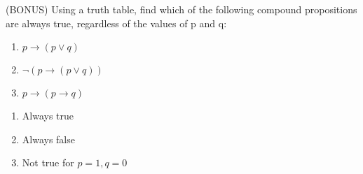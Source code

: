 \documentclass[solution, letterpaper]{cs20inclass}
\begin{document}
\problem (BONUS) Using a truth table, find which of the following compound propositions are always true, regardless of the values of p and q: 

\begin{enumerate} 
\item $p \rightarrow (p \lor q)$
\item $\lnot (p \rightarrow (p \lor q))$
\item $p \rightarrow (p \rightarrow q)$
\end{enumerate}

\begin{solution}

\begin{enumerate} 
\item Always true
\item Always false
\item Not true for $p = 1, q = 0$
\end{enumerate}

\end{solution}
\end{document}
